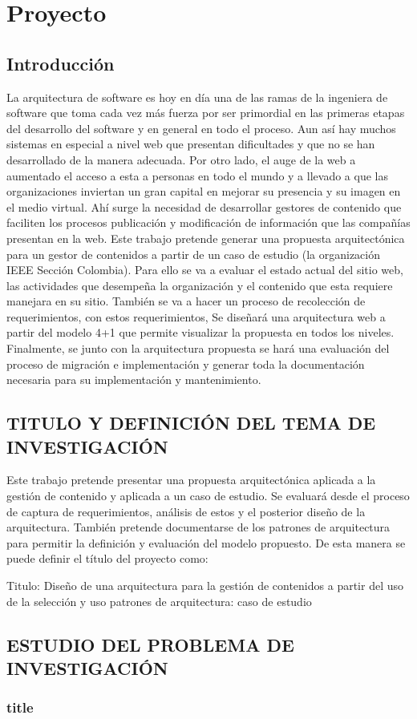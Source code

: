 \chapter{Proyecto}
\section{Introducción}
La arquitectura de software es hoy en día una de las ramas de la ingeniera de software que toma cada vez más fuerza por ser primordial en las primeras etapas del desarrollo del software y en general en todo el proceso. Aun así hay muchos sistemas en especial a nivel web que presentan dificultades y que no se han desarrollado de la manera adecuada. Por otro lado, el auge de la web a aumentado el acceso a esta a personas en todo el mundo y a llevado a que las organizaciones inviertan un gran capital en mejorar su presencia y su imagen en el medio virtual. Ahí surge la necesidad de desarrollar gestores de contenido que faciliten los procesos publicación y modificación de información que las compañías presentan en la web. Este trabajo pretende generar una propuesta arquitectónica para un gestor de contenidos a partir de un caso de estudio (la organización IEEE Sección Colombia). Para ello se va a evaluar el estado actual del sitio web, las actividades que desempeña la organización y el contenido que esta requiere manejara en su sitio. También se va a hacer un proceso de recolección de requerimientos, con estos requerimientos, Se diseñará una arquitectura web a partir del modelo 4+1 que permite visualizar la propuesta en todos los niveles. Finalmente, se junto con la arquitectura propuesta se hará una evaluación del proceso de migración e implementación y generar toda la documentación necesaria para su implementación y mantenimiento.

\section{TITULO Y DEFINICIÓN DEL TEMA DE INVESTIGACIÓN}

Este trabajo pretende presentar una propuesta arquitectónica aplicada a la gestión de contenido y aplicada a un caso de estudio. Se evaluará desde el proceso de captura de requerimientos, análisis de estos y el posterior diseño de la arquitectura. También pretende documentarse de los patrones de arquitectura para permitir la definición y evaluación del modelo propuesto. De esta manera se puede definir el título del proyecto como:


Titulo: Diseño de una arquitectura para la gestión de contenidos a partir del uso de la selección y uso patrones de arquitectura: caso de estudio


\section{ESTUDIO DEL PROBLEMA DE INVESTIGACIÓN}

\subsection[short title]{title}
\newpage
